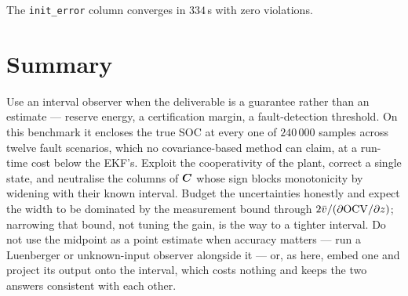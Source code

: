 The \texttt{init\_error} column converges in $334$\,s with zero violations.

\section{Summary}
Use an interval observer when the deliverable is a guarantee rather than an estimate --- reserve
energy, a certification margin, a fault-detection threshold.  On this benchmark it encloses the
true SOC at every one of $240\,000$ samples across twelve fault scenarios, which no
covariance-based method can claim, at a run-time cost below the EKF's.  Exploit the cooperativity
of the plant, correct a single state, and neutralise the columns of $\bm{C}$ whose sign blocks
monotonicity by widening with their known interval.  Budget the uncertainties honestly and expect
the width to be dominated by the measurement bound through $2\bar{v}/(\partial\mathrm{OCV}/\partial z)$;
narrowing that bound, not tuning the gain, is the way to a tighter interval.  Do not use the
midpoint as a point estimate when accuracy matters --- run a Luenberger or unknown-input observer
alongside it --- or, as here, embed one and project its output onto the interval, which costs
nothing and keeps the two answers consistent with each other.
